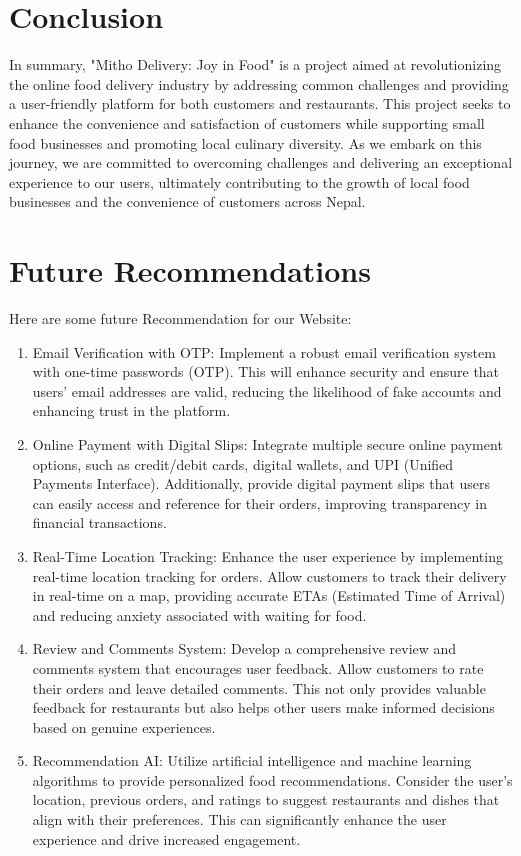 \section{Conclusion}
In summary, "Mitho Delivery: Joy in Food" is a project aimed at revolutionizing the online food delivery industry by addressing common challenges and providing a user-friendly platform for both customers and restaurants. This project seeks to enhance the convenience and satisfaction of customers while supporting small food businesses and promoting local culinary diversity.
As we embark on this journey, we are committed to overcoming challenges and delivering an exceptional experience to our users, ultimately contributing to the growth of local food businesses and the convenience of customers across Nepal.

\newpage
\section{Future Recommendations}
Here are some future Recommendation for our Website:
\begin{enumerate}
\item {Email Verification with OTP:} Implement a robust email verification system with one-time passwords (OTP). This will enhance security and ensure that users' email addresses are valid, reducing the likelihood of fake accounts and enhancing trust in the platform.

\item {Online Payment with Digital Slips:} Integrate multiple secure online payment options, such as credit/debit cards, digital wallets, and UPI (Unified Payments Interface). Additionally, provide digital payment slips that users can easily access and reference for their orders, improving transparency in financial transactions.

\item {Real-Time Location Tracking:} Enhance the user experience by implementing real-time location tracking for orders. Allow customers to track their delivery in real-time on a map, providing accurate ETAs (Estimated Time of Arrival) and reducing anxiety associated with waiting for food.

\item {Review and Comments System:} Develop a comprehensive review and comments system that encourages user feedback. Allow customers to rate their orders and leave detailed comments. This not only provides valuable feedback for restaurants but also helps other users make informed decisions based on genuine experiences.

\item {Recommendation AI:} Utilize artificial intelligence and machine learning algorithms to provide personalized food recommendations. Consider the user's location, previous orders, and ratings to suggest restaurants and dishes that align with their preferences. This can significantly enhance the user experience and drive increased engagement.
\end{enumerate}

